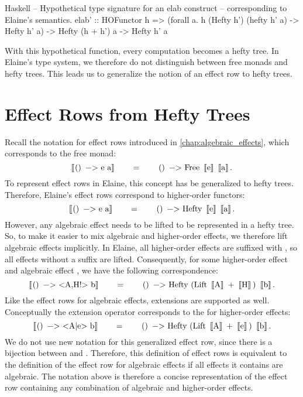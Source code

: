 \begin{lst}{Haskell}
-- Hypothetical type signature for an elab construct
-- corresponding to Elaine's semantics.
elab' :: HOFunctor h
  => (forall a. h (Hefty h') (hefty h' a) -> Hefty h' a)
  -> Hefty (h + h') a
  -> Hefty h' a
\end{lst}

With this hypothetical  function, every computation becomes a hefty tree. In Elaine's type system, we therefore do not distinguish between free monads and hefty trees. This leads us to generalize the notion of an effect row to hefty trees.

\section{Effect Rows from Hefty Trees}\label{sec:hoeffectrow}
\newcommand\BB[1]{\left\llbracket\mcode{#1}\right\rrbracket}

Recall the notation for effect rows introduced in \cref{chap:algebraic_effects}, which corresponds to the free monad:
\[
  \BB{() -> e a}
  \qquad=\qquad
  \mcode{() -> Free}\ \BB{e}\ \BB{a}.
\]
To represent effect rows in Elaine, this concept has be generalized to hefty trees. Therefore, Elaine's effect rows correspond to higher-order functors:
\[
  \BB{() -> e a}
  \qquad=\qquad
  \mcode{() -> Hefty}\ \BB{e}\ \BB{a}.
\]
However, any algebraic effect needs to be lifted to be represented in a hefty tree. So, to make it easier to mix algebraic and higher-order effects, we therefore lift algebraic effects implicitly. In Elaine, all higher-order effects are suffixed with \hs{!}, so all effects without a \el{!} suffix are lifted. Consequently, for some higher-order effect  and algebraic effect , we have the following correspondence:
\[
  \BB{() -> <A,H!> b}
  \qquad=\qquad
  \mcode{() -> Hefty (Lift}
    \ \BB{A}
    \ \mcode{+}
    \ \BB{H}
    \mcode{)}
    \ \BB{b}.
\]
Like the effect rows for algebraic effects, extensions are supported as well. Conceptually the extension operator corresponds to the \hs{+} for higher-order effects:
\[
  \BB{() -> <A|e> b}
  \qquad=\qquad
  \mcode{() -> Hefty (Lift}
    \ \BB{A}
    \ \mcode{+}
    \ \BB{e}\mcode{)}
    \ \BB{b}.
\]
We do not use new notation for this generalized effect row, since there is a bijection between  and . Therefore, this definition of effect rows is equivalent to the definition of the effect row for algebraic effects if all effects it contains are algebraic. The notation above is therefore a concise representation of the effect row containing any combination of algebraic and higher-order effects.
